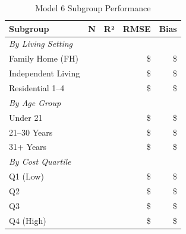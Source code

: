 \begin{table}[h]
\centering
\caption{Model 6 Subgroup Performance}
\begin{tabular}{lrrrr}
\toprule
\textbf{Subgroup} & \textbf{N} & \textbf{R²} & \textbf{RMSE} & \textbf{Bias} \\
\midrule
\multicolumn{5}{l}{\textit{By Living Setting}} \\
Family Home (FH) & \ModelSixSubgrouplivingFHN{} & \ModelSixSubgrouplivingFHRSquared{} & \$\ModelSixSubgrouplivingFHRMSE{} & \$\ModelSixSubgrouplivingFHBias{} \\
Independent Living & \ModelSixSubgrouplivingILSLN{} & \ModelSixSubgrouplivingILSLRSquared{} & \$\ModelSixSubgrouplivingILSLRMSE{} & \$\ModelSixSubgrouplivingILSLBias{} \\
Residential 1--4 & \ModelSixSubgrouplivingRHOneToFourN{} & \ModelSixSubgrouplivingRHOneToFourRSquared{} & \$\ModelSixSubgrouplivingRHOneToFourRMSE{} & \$\ModelSixSubgrouplivingRHOneToFourBias{} \\
\midrule
\multicolumn{5}{l}{\textit{By Age Group}} \\
Under 21 & \ModelSixSubgroupageAgeUnderTwentyOneN{} & \ModelSixSubgroupageAgeUnderTwentyOneRSquared{} & \$\ModelSixSubgroupageAgeUnderTwentyOneRMSE{} & \$\ModelSixSubgroupageAgeUnderTwentyOneBias{} \\
21--30 Years & \ModelSixSubgroupageAgeTwentyOneToThirtyN{} & \ModelSixSubgroupageAgeTwentyOneToThirtyRSquared{} & \$\ModelSixSubgroupageAgeTwentyOneToThirtyRMSE{} & \$\ModelSixSubgroupageAgeTwentyOneToThirtyBias{} \\
31+ Years & \ModelSixSubgroupageAgeThirtyOnePlusN{} & \ModelSixSubgroupageAgeThirtyOnePlusRSquared{} & \$\ModelSixSubgroupageAgeThirtyOnePlusRMSE{} & \$\ModelSixSubgroupageAgeThirtyOnePlusBias{} \\
\midrule
\multicolumn{5}{l}{\textit{By Cost Quartile}} \\
Q1 (Low) & \ModelSixSubgroupcostQOneLowN{} & \ModelSixSubgroupcostQOneLowRSquared{} & \$\ModelSixSubgroupcostQOneLowRMSE{} & \$\ModelSixSubgroupcostQOneLowBias{} \\
Q2 & \ModelSixSubgroupcostQTwoN{} & \ModelSixSubgroupcostQTwoRSquared{} & \$\ModelSixSubgroupcostQTwoRMSE{} & \$\ModelSixSubgroupcostQTwoBias{} \\
Q3 & \ModelSixSubgroupcostQThreeN{} & \ModelSixSubgroupcostQThreeRSquared{} & \$\ModelSixSubgroupcostQThreeRMSE{} & \$\ModelSixSubgroupcostQThreeBias{} \\
Q4 (High) & \ModelSixSubgroupcostQFourHighN{} & \ModelSixSubgroupcostQFourHighRSquared{} & \$\ModelSixSubgroupcostQFourHighRMSE{} & \$\ModelSixSubgroupcostQFourHighBias{} \\
\bottomrule
\end{tabular}
\end{table}

